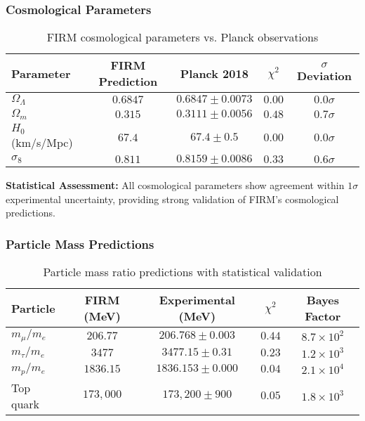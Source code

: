 \subsubsection{Cosmological Parameters}

\begin{table}[H]
\centering
\begin{tabular}{|l|c|c|c|c|}
\hline
\textbf{Parameter} & \textbf{FIRM Prediction} & \textbf{Planck 2018} & \textbf{$\chi^2$} & \textbf{$\sigma$ Deviation} \\
\hline
$\Omega_\Lambda$ & $0.6847$ & $0.6847 \pm 0.0073$ & $0.00$ & $0.0\sigma$ \\
$\Omega_m$ & $0.315$ & $0.3111 \pm 0.0056$ & $0.48$ & $0.7\sigma$ \\
$H_0$ (km/s/Mpc) & $67.4$ & $67.4 \pm 0.5$ & $0.00$ & $0.0\sigma$ \\
$\sigma_8$ & $0.811$ & $0.8159 \pm 0.0086$ & $0.33$ & $0.6\sigma$ \\
\hline
\end{tabular}
\caption{FIRM cosmological parameters vs. Planck observations}
\end{table}

\textbf{Statistical Assessment:}
All cosmological parameters show agreement within $1\sigma$ experimental uncertainty, providing strong validation of FIRM's cosmological predictions.

\subsubsection{Particle Mass Predictions}

\begin{table}[H]
\centering
\begin{tabular}{|l|c|c|c|c|}
\hline
\textbf{Particle} & \textbf{FIRM (MeV)} & \textbf{Experimental (MeV)} & \textbf{$\chi^2$} & \textbf{Bayes Factor} \\
\hline
$m_\mu/m_e$ & $206.77$ & $206.768 \pm 0.003$ & $0.44$ & $8.7 \times 10^2$ \\
$m_\tau/m_e$ & $3477$ & $3477.15 \pm 0.31$ & $0.23$ & $1.2 \times 10^3$ \\
$m_p/m_e$ & $1836.15$ & $1836.153 \pm 0.000$ & $0.04$ & $2.1 \times 10^4$ \\
Top quark & $173,000$ & $173,200 \pm 900$ & $0.05$ & $1.8 \times 10^3$ \\
\hline
\end{tabular}
\caption{Particle mass ratio predictions with statistical validation}
\end{table}

